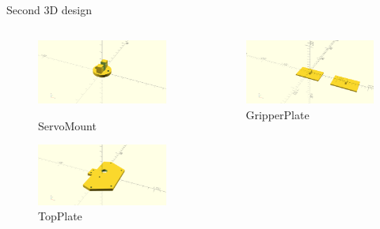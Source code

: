 \documentclass[10pt,a4paper]{beamer}
\begin{document}
\begin{frame}{Second 3D design}
\begin{columns}
\begin{figure}
\includegraphics[scale=0.1]{ServoMount.png}\caption{\small{ServoMount}}
\includegraphics[scale=0.1]{TopPlate.png}\caption{\small{TopPlate}}
\end{figure}
\column{0.3\framewidth}
\begin{figure}
\includegraphics[scale=0.1]{GripperPlate.png}\caption{\small{GripperPlate}}
\end{figure}
\end{columns}
\end{frame}
\end{document}
